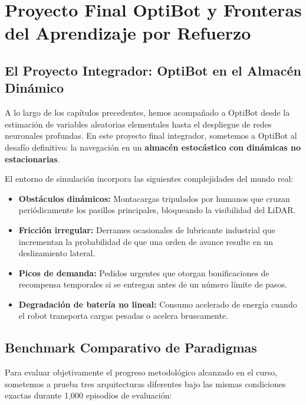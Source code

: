 \chapter{Proyecto Final OptiBot y Fronteras del Aprendizaje por Refuerzo}
\label{cap:proyecto_fronteras}

\section{El Proyecto Integrador: OptiBot en el Almacén Dinámico}
A lo largo de los capítulos precedentes, hemos acompañado a OptiBot desde la estimación de variables aleatorias elementales hasta el despliegue de redes neuronales profundas. En este proyecto final integrador, sometemos a OptiBot al desafío definitivo: la navegación en un \textbf{almacén estocástico con dinámicas no estacionarias}.

\begin{optibot}
El entorno de simulación incorpora las siguientes complejidades del mundo real:
\begin{itemize}
  \item \textbf{Obstáculos dinámicos:} Montacargas tripulados por humanos que cruzan periódicamente los pasillos principales, bloqueando la visibilidad del LiDAR.
  \item \textbf{Fricción irregular:} Derrames ocasionales de lubricante industrial que incrementan la probabilidad de que una orden de avance resulte en un deslizamiento lateral.
  \item \textbf{Picos de demanda:} Pedidos urgentes que otorgan bonificaciones de recompensa temporales si se entregan antes de un número límite de pasos.
  \item \textbf{Degradación de batería no lineal:} Consumo acelerado de energía cuando el robot transporta cargas pesadas o acelera bruscamente.
\end{itemize}
\end{optibot}

\section{Benchmark Comparativo de Paradigmas}
Para evaluar objetivamente el progreso metodológico alcanzado en el curso, sometemos a prueba tres arquitecturas diferentes bajo las mismas condiciones exactas durante 1,000 episodios de evaluación:

